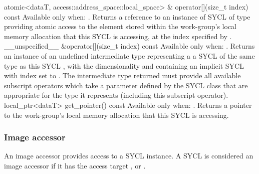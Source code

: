   \addRowTwoL
    { atomic<dataT, access::address_space::local_space> \& }
    { operator[](size_t index) const }
    {
      Available only when: .
      \newline
      Returns a reference to an instance of SYCL  of type
       providing atomic access to the element stored within
      the work-group's local memory allocation that this SYCL 
      is accessing, at the index specified by .
    }
  \addRow
    { \__unspecified__ \&operator[](size_t index) const }
    {
      Available only when: .
      \newline
      Returns an instance of an undefined intermediate type representing a
      a SYCL  of the same type as this SYCL , with the dimensionality  and
      containing an implicit SYCL  with index  set to . The intermediate type returned
      must provide all available subscript operators which take a  parameter defined by the SYCL  class that
      are appropriate for the type it represents (including this subscript
      operator).
    }
  \addRow
    { local_ptr<dataT> get_pointer() const}
    {
      Available only when: .
      Returns a pointer to the work-group's local memory allocation that this
      SYCL  is accessing.
    }
\completeTable


\subsubsection{Image accessor}
\label{sub.section.accessors.image}

An image accessor provides access to a SYCL  instance. A SYCL  is considered an image accessor if it has the access
target ,  or .
      
